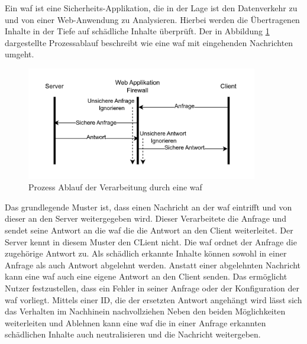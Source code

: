 \label{chap:waf-theory}
Ein \ac{waf} ist eine Sicherheits-Applikation, die in der Lage ist den Datenverkehr zu und von einer Web-Anwendung zu Analysieren.
Hierbei werden die Übertragenen Inhalte in der Tiefe auf schädliche Inhalte überprüft.
Der in Abbildung \ref{fig:waf-porcess-flow} dargestellte Prozessablauf beschreibt wie eine \ac{waf} mit eingehenden Nachrichten umgeht.

\begin{figure}[!hbt]
    \centering
    \includegraphics[width=0.9\textwidth]{./images/Waf-Process-fliow.png}
    \caption{Prozess Ablauf der Verarbeitung durch eine \ac{waf}}
    \label{fig:waf-porcess-flow}
\end{figure}

Das grundlegende Muster ist, dass einen Nachricht an der \ac{waf} eintrifft und von dieser an den Server weitergegeben wird.
Dieser Verarbeitete die Anfrage und sendet seine Antwort an die \ac{waf} die die Antwort an den Client weiterleitet.
Der Server kennt in diesem Muster den CLient nicht.
Die \ac{waf} ordnet der Anfrage die zugehörige Antwort zu.
Als schädlich erkannte Inhalte können sowohl in einer Anfrage als auch Antwort abgelehnt werden.
Anstatt einer abgelehnten Nachricht kann eine \ac{waf} auch eine eigene Antwort an den Client senden.
Das ermöglicht Nutzer festzustellen, dass ein Fehler in seiner Anfrage oder der Konfiguration der \ac{waf} vorliegt.
Mittels einer ID, die der ersetzten Antwort angehängt wird lässt sich das Verhalten im Nachhinein nachvollziehen
Neben den beiden Möglichkeiten weiterleiten und Ablehnen kann eine \ac{waf} die in einer Anfrage erkannten schädlichen Inhalte auch neutralisieren und die Nachricht weitergeben.\\

